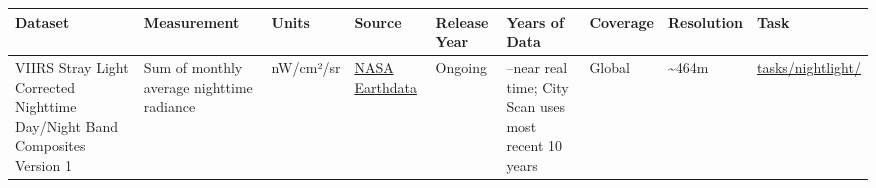 \documentclass[
  letterpaper,
  DIV=11,
  numbers=noendperiod]{scrreprt}
\newcounter{none} %
\begin{document}
{\def\LTcaptype{none} %
\begin{longtable}[]{@{}
  >{\raggedright\arraybackslash}p{}
  >{\raggedright\arraybackslash}p{}
  >{\raggedright\arraybackslash}p{}
  >{\raggedright\arraybackslash}p{}
  >{\raggedright\arraybackslash}p{}
  >{\raggedright\arraybackslash}p{}
  >{\raggedright\arraybackslash}p{}
  >{\raggedright\arraybackslash}p{}
  >{\raggedright\arraybackslash}p{}@{}}
\toprule\noalign{}
\begin{minipage}[b]{\linewidth}\raggedright
Dataset
\end{minipage} & \begin{minipage}[b]{\linewidth}\raggedright
Measurement
\end{minipage} & \begin{minipage}[b]{\linewidth}\raggedright
Units
\end{minipage} & \begin{minipage}[b]{\linewidth}\raggedright
Source
\end{minipage} & \begin{minipage}[b]{\linewidth}\raggedright
Release Year
\end{minipage} & \begin{minipage}[b]{\linewidth}\raggedright
Years of Data
\end{minipage} & \begin{minipage}[b]{\linewidth}\raggedright
Coverage
\end{minipage} & \begin{minipage}[b]{\linewidth}\raggedright
Resolution
\end{minipage} & \begin{minipage}[b]{\linewidth}\raggedright
Task
\end{minipage} \\
\midrule\noalign{}
\endhead
\bottomrule\noalign{}
\endlastfoot
VIIRS Stray Light Corrected Nighttime Day/Night Band Composites Version
1 & Sum of monthly average nighttime radiance & nW/cm²/sr &
\href{https://earthdata.nasa.gov/earth-observation-data/near-real-time/download-nrt-data/viirs-nrt}{NASA
Earthdata} & Ongoing & 2013--near real time; City Scan uses most recent
10 years & Global & \textasciitilde464m &
\href{../tasks/nightlight/}{tasks/nightlight/} \\
\end{longtable}
}
\end{document}
